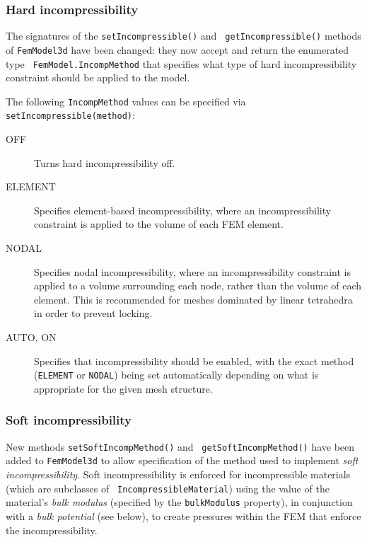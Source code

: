 \documentclass{article}
\begin{document}
\subsubsection*{Hard incompressibility}

The signatures of the {\tt setIncompressible()} and {\tt
getIncompressible()} methods of {\tt FemModel3d} have been changed:
they now accept and return the enumerated type {\tt
FemModel.IncompMethod} that specifies what type of hard
incompressibility constraint should be applied to the model.

The following {\tt IncompMethod} values can be specified via {\tt
setIncompressible(method)}:

\begin{description}

\item[OFF] \mbox{}
Turns hard incompressibility off.

\item[ELEMENT] \mbox{} 
Specifies element-based incompressibility,
where an incompressibility constraint is applied to the volume of each
FEM element. 

\item[NODAL] \mbox{} 
Specifies nodal incompressibility, where an
incompressibility constraint is applied to a volume surrounding each
node, rather than the volume of each element. This is recommended for
meshes dominated by linear tetrahedra in order to prevent locking.

\item[AUTO, ON] \mbox{}
Specifies that incompressibility should be enabled, with the
exact method  ({\tt ELEMENT} or {\tt NODAL}) being
set automatically depending
on what is appropriate for the given mesh structure.

\end{description}

\subsubsection*{Soft incompressibility}

New methods {\tt setSoftIncompMethod()} and {\tt
getSoftIncompMethod()} have been added to {\tt FemModel3d} to allow
specification of the method used to implement {\it soft
incompressibility}. Soft incompressibility is enforced for
incompressible materials (which are subclasses of {\tt
IncompressibleMaterial}) using the value of the material's {\it bulk
modulus} (specified by the {\tt bulkModulus} property), in conjunction
with a {\it bulk potential} (see below), to create pressures within
the FEM that enforce the incompressibility.
\end{document}
